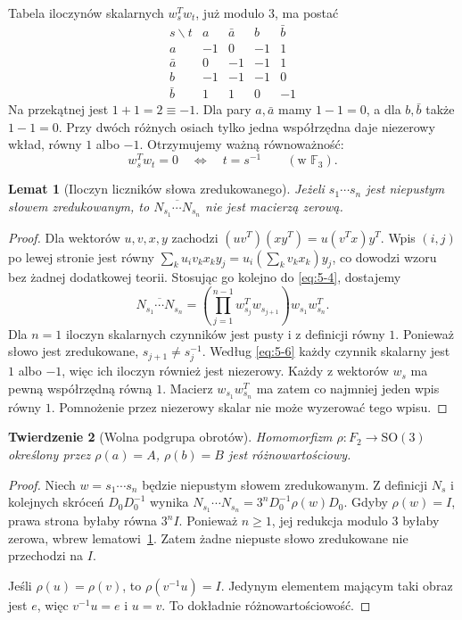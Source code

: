 \documentclass[11pt,a4paper]{article}
\numberwithin{equation}{section}
\theoremstyle{plain}
\newtheorem{twierdzenie}{Twierdzenie}[section]
\newtheorem{lemat}[twierdzenie]{Lemat}
\theoremstyle{definition}
\theoremstyle{remark}
\newcommand{\F}{\mathbb F}
\begin{document}
Tabela iloczynów skalarnych $w_s^Tw_t$, już modulo $3$, ma postać
\begin{equation}\label{eq:5-5}
\begin{array}{c|rrrr}
 s\backslash t&a&\bar a&b&\bar b\\\hline
 a&-1&0&-1&1\\
 \bar a&0&-1&-1&1\\
 b&-1&-1&-1&0\\
 \bar b&1&1&0&-1
\end{array}
\end{equation}
Na przekątnej jest $1+1=2\equiv-1$. Dla pary $a,\bar a$ mamy $1-1=0$, a dla $b,\bar b$ także $1-1=0$. Przy dwóch różnych osiach tylko jedna współrzędna daje niezerowy wkład, równy $1$ albo $-1$. Otrzymujemy ważną równoważność:
\begin{equation}\label{eq:5-6}
 w_s^Tw_t=0\quad\Longleftrightarrow\quad t=s^{-1} \qquad(\text{w }\F_3).
\end{equation}
\begin{lemat}[Iloczyn liczników słowa zredukowanego]\label{lem:liczniki}
Jeżeli $s_1\cdots s_n$ jest niepustym słowem zredukowanym, to $\overline{N_{s_1}\cdots N_{s_n}}$ nie jest macierzą zerową.
\end{lemat}
\begin{proof}
Dla wektorów $u,v,x,y$ zachodzi $(uv^T)(xy^T)=u(v^Tx)y^T$. Wpis $(i,j)$ po lewej stronie jest równy $\sum_k u_iv_kx_ky_j=u_i(\sum_kv_kx_k)y_j$, co dowodzi wzoru bez żadnej dodatkowej teorii. Stosując go kolejno do \eqref{eq:5-4}, dostajemy
\begin{equation}\label{eq:5-7}
 \overline{N_{s_1}\cdots N_{s_n}}=
 \left(\prod_{j=1}^{n-1}w_{s_j}^Tw_{s_{j+1}}\right)w_{s_1}w_{s_n}^T.
\end{equation}
Dla $n=1$ iloczyn skalarnych czynników jest pusty i z definicji równy $1$. Ponieważ słowo jest zredukowane, $s_{j+1}\ne s_j^{-1}$. Według \eqref{eq:5-6} każdy czynnik skalarny jest $1$ albo $-1$, więc ich iloczyn również jest niezerowy. Każdy z wektorów $w_s$ ma pewną współrzędną równą $1$. Macierz $w_{s_1}w_{s_n}^T$ ma zatem co najmniej jeden wpis równy $1$. Pomnożenie przez niezerowy skalar nie może wyzerować tego wpisu.
\end{proof}
\begin{twierdzenie}[Wolna podgrupa obrotów]\label{tw:wolne-obroty}
Homomorfizm $\rho:F_2\to\mathrm{SO}(3)$ określony przez $\rho(a)=A$, $\rho(b)=B$ jest różnowartościowy.
\end{twierdzenie}
\begin{proof}
Niech $w=s_1\cdots s_n$ będzie niepustym słowem zredukowanym. Z definicji $N_s$ i kolejnych skróceń $D_0D_0^{-1}$ wynika $N_{s_1}\cdots N_{s_n}=3^nD_0^{-1}\rho(w)D_0$. Gdyby $\rho(w)=I$, prawa strona byłaby równa $3^nI$. Ponieważ $n\ge1$, jej redukcja modulo $3$ byłaby zerowa, wbrew lematowi~\ref{lem:liczniki}. Zatem żadne niepuste słowo zredukowane nie przechodzi na $I$.

Jeśli $\rho(u)=\rho(v)$, to $\rho(v^{-1}u)=I$. Jedynym elementem mającym taki obraz jest $e$, więc $v^{-1}u=e$ i $u=v$. To dokładnie różnowartościowość.
\end{proof}
\end{document}

